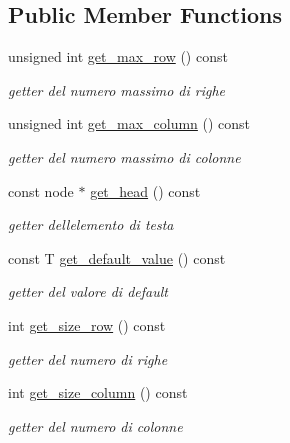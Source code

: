 \subsection*{Public Member Functions}
\begin{DoxyCompactItemize}
\item 
unsigned int \hyperlink{classsparse__matrix_aa2b5034b4293e98dbe9c93c85150f65c}{get\+\_\+max\+\_\+row} () const
\begin{DoxyCompactList}\small\item\em getter del numero massimo di righe \end{DoxyCompactList}\item 
unsigned int \hyperlink{classsparse__matrix_a73047cce3fef6fcab0cd3121c99d60cb}{get\+\_\+max\+\_\+column} () const
\begin{DoxyCompactList}\small\item\em getter del numero massimo di colonne \end{DoxyCompactList}\item 
const node $\ast$ \hyperlink{classsparse__matrix_a49d501293976bd2aaf8ec6f48b5ceb9b}{get\+\_\+head} () const
\begin{DoxyCompactList}\small\item\em getter dell\textquotesingle{}elemento di testa \end{DoxyCompactList}\item 
const T \hyperlink{classsparse__matrix_a6251f1f94b86e04ac4a4fe59155ed826}{get\+\_\+default\+\_\+value} () const
\begin{DoxyCompactList}\small\item\em getter del valore di default \end{DoxyCompactList}\item 
int \hyperlink{classsparse__matrix_ab6b17669a2fa27844d62948b6c5a0bc9}{get\+\_\+size\+\_\+row} () const
\begin{DoxyCompactList}\small\item\em getter del numero di righe \end{DoxyCompactList}\item 
int \hyperlink{classsparse__matrix_aca943521574c4c5b5d9c73e6ea897e37}{get\+\_\+size\+\_\+column} () const
\begin{DoxyCompactList}\small\item\em getter del numero di colonne \end{DoxyCompactList}\item 
\mbox{\label{classsparse__matrix_ad4970d9a545d5b92ddeb0ccbdb248ef9}} 

\end{DoxyCompactItemize}
